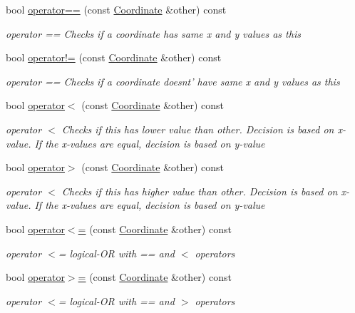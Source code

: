 \begin{DoxyCompactItemize}
bool \hyperlink{class_course_1_1_coordinate_a55e7cb333955be550dae69e7e32f5f47}{operator==} (const \hyperlink{class_course_1_1_coordinate}{Coordinate} \&other) const 
\begin{DoxyCompactList}\small\item\em operator == Checks if a coordinate has same x and y values as this \end{DoxyCompactList}\item 
bool \hyperlink{class_course_1_1_coordinate_aa7574af9c5a7ba98dfda04aebcdd9e40}{operator!=} (const \hyperlink{class_course_1_1_coordinate}{Coordinate} \&other) const 
\begin{DoxyCompactList}\small\item\em operator == Checks if a coordinate doesnt' have same x and y values as this \end{DoxyCompactList}\item 
bool \hyperlink{class_course_1_1_coordinate_a2db7e3cfaae46d2e963bf865911c5437}{operator$<$} (const \hyperlink{class_course_1_1_coordinate}{Coordinate} \&other) const 
\begin{DoxyCompactList}\small\item\em operator $<$ Checks if this has lower value than other. Decision is based on x-\/value. If the x-\/values are equal, decision is based on y-\/value \end{DoxyCompactList}\item 
bool \hyperlink{class_course_1_1_coordinate_a47cdf0172e4e421857da399624a60c93}{operator$>$} (const \hyperlink{class_course_1_1_coordinate}{Coordinate} \&other) const 
\begin{DoxyCompactList}\small\item\em operator $<$ Checks if this has higher value than other. Decision is based on x-\/value. If the x-\/values are equal, decision is based on y-\/value \end{DoxyCompactList}\item 
bool \hyperlink{class_course_1_1_coordinate_ae0d5b38c5e3f645576483db7f93a5e27}{operator$<$=} (const \hyperlink{class_course_1_1_coordinate}{Coordinate} \&other) const 
\begin{DoxyCompactList}\small\item\em operator $<$= logical-\/\-O\-R with == and $<$ operators \end{DoxyCompactList}\item 
bool \hyperlink{class_course_1_1_coordinate_abdb1bf21cc8cb30784c88311d9034780}{operator$>$=} (const \hyperlink{class_course_1_1_coordinate}{Coordinate} \&other) const 
\begin{DoxyCompactList}\small\item\em operator $<$= logical-\/\-O\-R with == and $>$ operators \end{DoxyCompactList}\end{DoxyCompactItemize}


